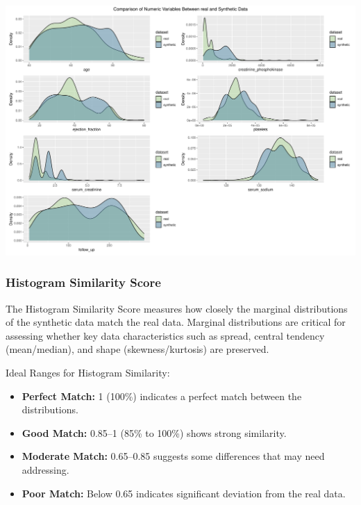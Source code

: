 \documentclass[
  letterpaper,
  DIV=11,
  numbers=noendperiod]{scrartcl}
\providecommand{\tightlist}{%
  \setlength{\itemsep}{0pt}\setlength{\parskip}{0pt}}\usepackage{longtable,booktabs,array}
\begin{document}
\begin{center}
\includegraphics[width=1\linewidth,height=\textheight,keepaspectratio]{heart_failure_synthetic_data_project_files/figure-pdf/Density Plots for Numeric Variables-1.pdf}
\end{center}

\subsubsection{Histogram Similarity
Score}\label{histogram-similarity-score}

The Histogram Similarity Score measures how closely the marginal
distributions of the synthetic data match the real data. Marginal
distributions are critical for assessing whether key data
characteristics such as spread, central tendency (mean/median), and
shape (skewness/kurtosis) are preserved.

Ideal Ranges for Histogram Similarity:

\begin{itemize}
\tightlist
\item
  \textbf{Perfect Match:} 1 (100\%) indicates a perfect match between
  the distributions.
\item
  \textbf{Good Match:} 0.85--1 (85\% to 100\%) shows strong similarity.
\item
  \textbf{Moderate Match:} 0.65--0.85 suggests some differences that may
  need addressing.
\item
  \textbf{Poor Match:} Below 0.65 indicates significant deviation from
  the real data.
\end{itemize}
\end{document}
